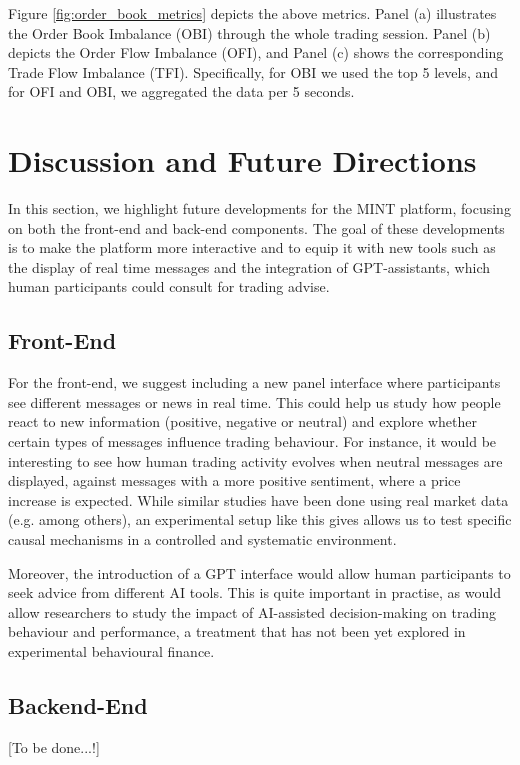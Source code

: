 Figure \ref{fig:order_book_metrics} depicts the above metrics. Panel (a) illustrates the Order Book Imbalance (OBI) through the whole trading session. Panel (b) depicts the Order Flow Imbalance (OFI), and Panel (c) shows the corresponding Trade Flow Imbalance (TFI). Specifically, for OBI we used the top 5 levels, and for OFI and OBI, we aggregated the data per 5 seconds.


\section{Discussion and Future Directions}
In this section, we highlight future developments for the MINT platform, focusing on both the front-end and back-end components. The goal of these developments is to make the platform more interactive and to equip it with new tools such as the display of real time messages and the integration of GPT-assistants, which human participants could consult for trading advise. 


\subsection{Front-End}
For the front-end, we suggest including a new panel interface where participants see different messages or news in real time. This could help us study how people react to new information (positive, negative or neutral) and explore whether certain types of messages influence trading behaviour. For instance, it would be interesting to see how human trading activity evolves when neutral messages are displayed, against messages with a more positive sentiment, where a price increase is expected. While similar studies have been done using real market data (e.g. \cite{kurov2019price} among others), an experimental setup like this gives allows us to test specific causal mechanisms in a controlled and systematic environment.

Moreover, the introduction of a GPT interface would allow human participants to seek advice from different AI tools. This is quite important in practise, as would allow researchers to study the impact of AI-assisted decision-making on trading behaviour and performance, a treatment that has not been yet explored in experimental behavioural finance. 

\subsection{Backend-End}
[To be done...!]

